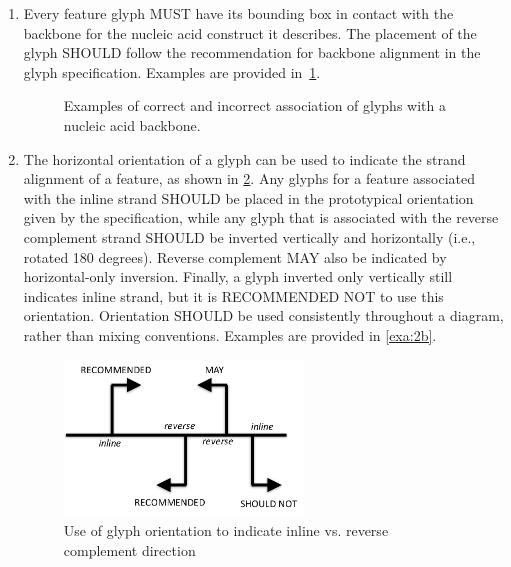 \begin{enumerate}
\item Every feature glyph MUST have its bounding box in contact with the backbone for the nucleic acid construct it describes. 
The placement of the glyph SHOULD follow the recommendation for backbone alignment in the glyph specification.
	Examples are provided in~\ref{exa:2a}.
   	\begin{figure}[h!]
	\centering
	\caption{Examples of correct and incorrect association of glyphs with a nucleic acid backbone.}
	\label{exa:2a}
	\end{figure}

\item The horizontal orientation of a glyph can be used to indicate the strand alignment of a feature, as shown in \ref{f:orientation}. 
	Any glyphs for a feature associated with the inline strand SHOULD be placed in the prototypical orientation given by the specification,
	while any glyph that is associated with the reverse complement strand SHOULD be inverted vertically and horizontally (i.e., rotated 180 degrees). 
	Reverse complement MAY also be indicated by horizontal-only inversion.
	Finally, a glyph inverted only vertically still indicates inline strand, but it is RECOMMENDED NOT to use this orientation.
	Orientation SHOULD be used consistently throughout a diagram, rather than mixing conventions.
	Examples are provided in \ref{exa:2b}.
	
	\begin{figure}[h!]
	\centering
	\includegraphics[width=2.5in]{figures/orientation.pdf}
	\caption{Use of glyph orientation to indicate inline vs. reverse complement direction}
	\label{f:orientation}
	\end{figure} 
	

\end{enumerate}
